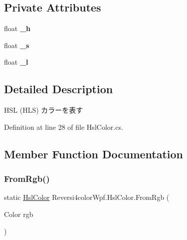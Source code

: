 \subsection*{Private Attributes}
\begin{DoxyCompactItemize}
\item 
\mbox{\label{class_reversi4color_wpf_1_1_hsl_color_a74f663b3518978652874c2ade02db3fd}} 
float {\bfseries \+\_\+h}
\item 
\mbox{\label{class_reversi4color_wpf_1_1_hsl_color_a031f8a61043584df81912a8e5aa618e1}} 
float {\bfseries \+\_\+s}
\item 
\mbox{\label{class_reversi4color_wpf_1_1_hsl_color_ad28b5c5b4feb65836a36b4d3c983eea2}} 
float {\bfseries \+\_\+l}
\end{DoxyCompactItemize}


\subsection{Detailed Description}
H\+SL (H\+LS) カラーを表す 

Definition at line 28 of file Hsl\+Color.\+cs.



\subsection{Member Function Documentation}
\mbox{\label{class_reversi4color_wpf_1_1_hsl_color_a3d77f09a4e86a60d6d135d8ffbcd3298}} 
\subsubsection{\texorpdfstring{From\+Rgb()}{FromRgb()}}
{\footnotesize\ttfamily static \hyperlink{class_reversi4color_wpf_1_1_hsl_color}{Hsl\+Color} Reversi4color\+Wpf.\+Hsl\+Color.\+From\+Rgb (\begin{DoxyParamCaption}\item[{Color}]{rgb }\end{DoxyParamCaption})\hspace{0.3cm}{\ttfamily [static]}}



